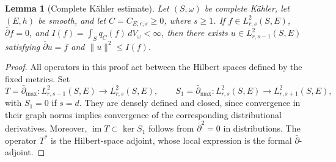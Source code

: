 \documentclass[11pt,reqno]{amsart}
\numberwithin{equation}{section}
\newtheorem{lemma}[theorem]{Lemma}
\theoremstyle{definition}
\theoremstyle{remark}
\begin{document}
\begin{lemma}[Complete K\"ahler estimate]\label{lem:complete-estimate}
Let $(S,\omega)$ be complete K\"ahler, let $(E,h)$ be smooth, and let
$C=C_{E;r,s}\ge0$, where $s\ge1$.  If $f\in L^2_{r,s}(S,E)$,
$\bar\partial f=0$, and $I(f)=\int_Sq_C(f)\,dV_\omega<\infty$, then
there exists $u\in L^2_{r,s-1}(S,E)$ satisfying
$\bar\partial u=f$ and $\|u\|^2\le I(f)$.
\end{lemma}
\begin{proof}
All operators in this proof act between the Hilbert spaces defined by
the fixed metrics.  Set
\[
 T=\bar\partial_{\max}:L^2_{r,s-1}(S,E)\longrightarrow L^2_{r,s}(S,E),
 \qquad
 S_1=\bar\partial_{\max}:L^2_{r,s}(S,E)\longrightarrow L^2_{r,s+1}(S,E),
\]
with $S_1=0$ if $s=d$.  They are densely defined and closed, since
convergence in their graph norms implies convergence of the
corresponding distributional derivatives.  Moreover,
$\operatorname{im}T\subset\ker S_1$ follows from
$\bar\partial^2=0$ in distributions.  The operator $T^*$ is the
Hilbert-space adjoint, whose local expression is the formal
$\bar\partial$-adjoint.


\end{proof}
\end{document}
